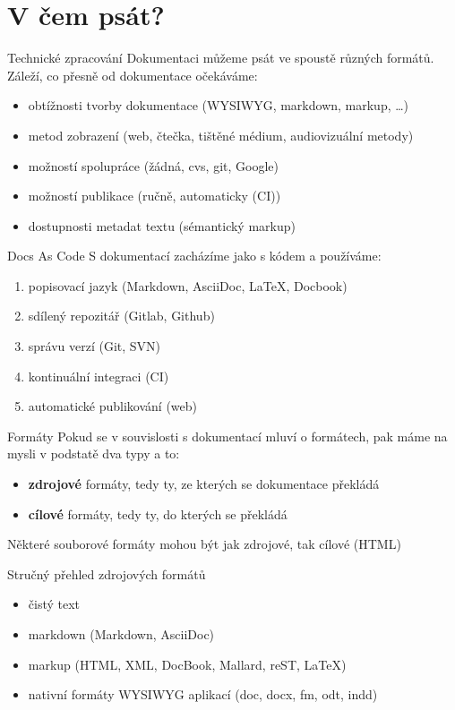 \documentclass[12pt,a4paper]{beamer}
\begin{document}
	\section{V čem psát?}

	\begin{frame}{Technické zpracování}
	Dokumentaci můžeme psát ve spoustě různých formátů. Záleží, co přesně od dokumentace očekáváme:
	\begin{itemize}
		\item obtížnosti tvorby dokumentace (WYSIWYG, markdown, markup, \ldots{})
		\item metod zobrazení (web, čtečka, tištěné médium, audiovizuální metody)
		\item možností spolupráce (žádná, cvs, git, Google)
		\item možností publikace (ručně, automaticky (CI))
		\item dostupnosti metadat textu (sémantický markup)
	\end{itemize}

	\end{frame}

	  \begin{frame}{Docs As Code}
S dokumentací zacházíme jako s kódem a používáme:
\begin{enumerate}
	\item popisovací jazyk (Markdown, AsciiDoc, \LaTeX, Docbook)
	\item sdílený repozitář (Gitlab, Github)
	\item správu verzí (Git, SVN)
	\item kontinuální integraci (CI)
	\item automatické publikování (web)
\end{enumerate}
\end{frame}


	\begin{frame}{Formáty}
	Pokud se v souvislosti s dokumentací mluví o formátech, pak máme na mysli v podstatě dva typy a to:
		\begin{itemize}
			\item \textbf{zdrojové} formáty, tedy ty, ze kterých se dokumentace překládá
			\item \textbf{cílové} formáty, tedy ty, do kterých se překládá
		\end{itemize}
	Některé souborové formáty mohou být jak zdrojové, tak cílové (HTML)
	\end{frame}

	\begin{frame}{Stručný přehled zdrojových formátů}
		\begin{itemize}
			\item čistý text
			\item markdown (Markdown, AsciiDoc)
			\item markup (HTML, XML, DocBook, Mallard, reST, \LaTeX)
			\item nativní formáty WYSIWYG aplikací (doc, docx, fm, odt, indd)
		\end{itemize}
	\end{frame}
\end{document}
